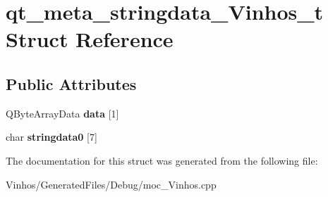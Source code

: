 \hypertarget{structqt__meta__stringdata___vinhos__t}{}\section{qt\+\_\+meta\+\_\+stringdata\+\_\+\+Vinhos\+\_\+t Struct Reference}
\label{structqt__meta__stringdata___vinhos__t}
\subsection*{Public Attributes}
\begin{DoxyCompactItemize}
\item 
\mbox{\label{structqt__meta__stringdata___vinhos__t_a6d76a5b9032e67aefa965cbe8bddea8a}} 
Q\+Byte\+Array\+Data {\bfseries data} \mbox{[}1\mbox{]}
\item 
\mbox{\label{structqt__meta__stringdata___vinhos__t_a90b0f4f3d276be386b01fa64609a409e}} 
char {\bfseries stringdata0} \mbox{[}7\mbox{]}
\end{DoxyCompactItemize}


The documentation for this struct was generated from the following file\+:\begin{DoxyCompactItemize}
\item 
Vinhos/\+Generated\+Files/\+Debug/moc\+\_\+\+Vinhos.\+cpp\end{DoxyCompactItemize}
